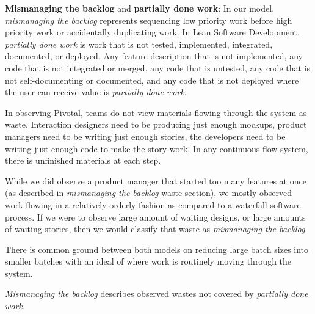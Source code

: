 \textbf{Mismanaging the backlog} and \textbf{partially done work}: In our model, \textit{mismanaging the backlog} represents sequencing low priority work before high priority work or accidentally duplicating work. In Lean Software Development, \textit{partially done work} is work that is not tested, implemented, integrated, documented, or deployed. Any feature description that is not implemented, any code that is not integrated or merged, any code that is untested, any code that is not self-documenting or documented, and any code that is not deployed where the user can receive value is \textit{partially done work}.

In observing Pivotal, teams do not view materials flowing through the system as waste. Interaction designers need to be producing just enough mockups, product managers need to be writing just enough stories, the developers need to be writing just enough code to make the story work. In any continuous flow system, there is unfinished materials at each step. 

While we did observe a product manager that started too many features at once (as described in \textit{mismanaging the backlog} waste section), we mostly observed work flowing in a relatively orderly fashion as compared to a waterfall software process. If we were to observe large amount of waiting designs, or large amounts of waiting stories, then we would classify that waste as \textit{mismanaging the backlog}.

There is common ground between both models on reducing large batch sizes into smaller batches with an ideal of   where work is routinely moving through the system. 

\textit{Mismanaging the backlog} describes observed wastes not covered by \textit{partially done work.}




